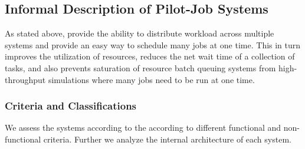 \documentclass{sig-alternate}
\begin{document}
\subsection{Informal Description of Pilot-Job Systems}
\label{sec:pj}


As stated above, \pilotjobs provide the ability to 
distribute workload across multiple systems and
provide an easy way to schedule many jobs at one time. This in turn
improves the utilization of resources, reduces the net wait time of a
collection of tasks, and also prevents saturation of resource batch
queuing systems from high-throughput simulations where many jobs
need to be run at one time.

\subsubsection{Criteria and Classifications}

We assess the \pilotjob systems according to the according to different 
functional and non-functional criteria. Further we analyze the internal 
architecture of each \pilotjob system.
\end{document}
